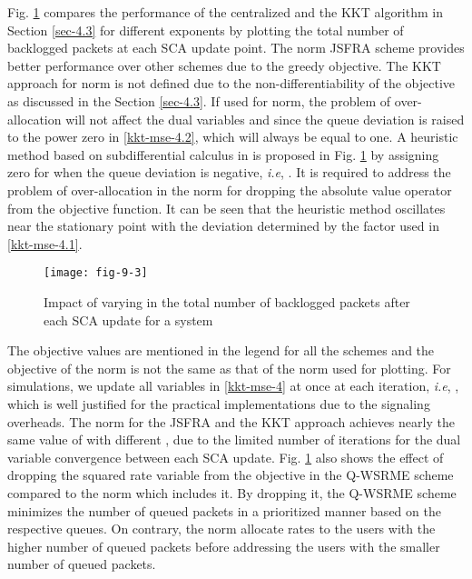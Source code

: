 Fig. \ref{fig-d-3.1} compares the performance of the centralized and the \ac{KKT} algorithm in Section \ref{sec-4.3} for different exponents by plotting the total number of backlogged packets at each \ac{SCA} update point. The  norm \ac{JSFRA} scheme provides better performance over other schemes due to the greedy objective. The \ac{KKT} approach for  norm is not defined due to the non-differentiability of the objective as discussed in the Section \ref{sec-4.3}. If used for  norm, the problem of over-allocation will not affect the dual variables  and  since the queue deviation is raised to the power zero in \eqref{kkt-mse-4.2}, which will always be equal to one. A heuristic method based on subdifferential calculus in \cite{bertsekas1999nonlinear} is proposed in Fig. \ref{fig-d-3.1} by assigning zero for  when the queue deviation is negative, \textit{i.e}, . It is required to address the problem of over-allocation in the  norm for dropping the absolute value operator from the objective function. It can be seen that the heuristic method oscillates near the stationary point with the deviation determined by the factor \me{\rho} used in \eqref{kkt-mse-4.1}.
\begin{figure}
	\centering
	\texttt{[image: fig-9-3]}
	\caption{Impact of varying  in the total number of backlogged packets after each \ac{SCA} update for a system }
	\label{fig-d-3.1}
\end{figure}

The objective values are mentioned in the legend for all the schemes and the objective of the  norm is not the same as that of the  norm used for plotting. For simulations, we update all variables in \eqref{kkt-mse-4} at once at each iteration, \textit{i.e}, , which is well justified for the practical implementations due to the signaling overheads. The  norm for the \ac{JSFRA} and the \ac{KKT} approach achieves nearly the same value of  with different \me{\chi}, due to the limited number of iterations for the dual variable convergence between each \ac{SCA} update. Fig. \ref{fig-d-3.1} also shows the effect of dropping the squared rate variable from the objective in the \ac{Q-WSRME} scheme compared to the  norm which includes it. By dropping it, the \ac{Q-WSRME} scheme minimizes the number of queued packets in a prioritized manner based on the respective queues. On contrary, the  norm allocate rates to the users with the higher number of queued packets before addressing the users with the smaller number of queued packets.


